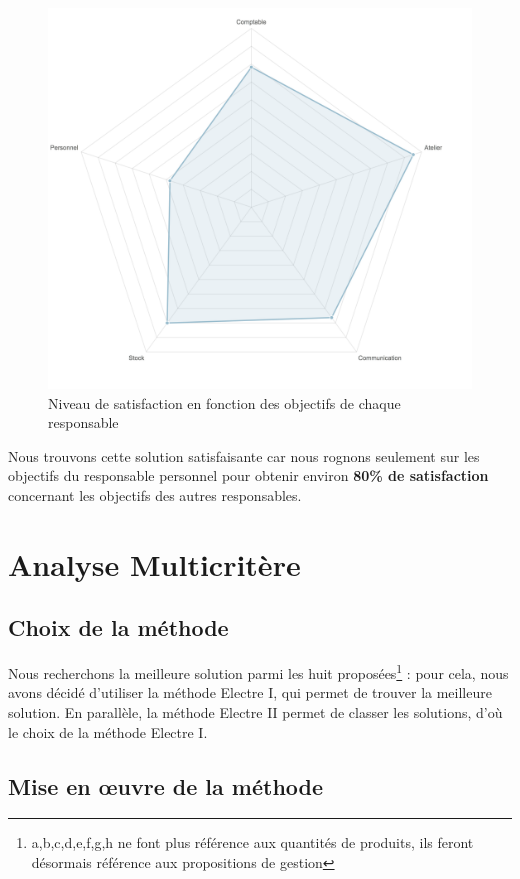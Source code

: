 \documentclass[a4paper, 11pt]{article}
\begin{document}
\begin{figure}[H]
    \begin{center}
        \includegraphics[scale=0.5]{../Partie2/Partie2.png}
        \caption{
            \label{fig} Niveau de satisfaction en fonction des objectifs de chaque responsable
        }
    \end{center}
\end{figure}
Nous trouvons cette solution satisfaisante car nous rognons seulement sur les objectifs du responsable personnel pour obtenir environ \textbf{80\% de satisfaction} concernant les objectifs des autres responsables. 
\newpage
\section{Analyse Multicritère}
\subsection{Choix de la méthode}
Nous recherchons la meilleure solution parmi les huit proposées\footnote{a,b,c,d,e,f,g,h ne font plus référence aux quantités de produits, ils feront désormais référence aux propositions de gestion} : pour cela, nous avons décidé d’utiliser la méthode Electre I, qui permet de trouver la meilleure solution. En parallèle, la méthode Electre II permet de classer les solutions, d’où le choix de la méthode Electre I.
\subsection{Mise en œuvre de la méthode}
\end{document}
